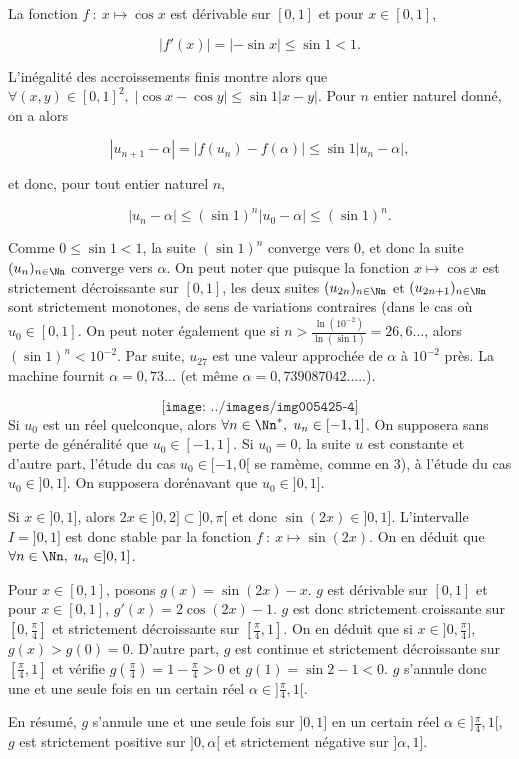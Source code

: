 {{La fonction $f~:~x\mapsto\cos x$ est dérivable sur $[0,1]$ et pour $x\in[0,1]$,

$$|f'(x)|=|-\sin x|\leq\sin1<1.$$

L'inégalité des accroissements finis montre alors que $\forall(x,y)\in[0,1]^2,\;|\cos x-\cos y|\leq\sin1|x-y|$. Pour $n$ entier naturel donné, on a alors

$$|u_{n+1}-\alpha|=|f(u_n)-f(\alpha)|\leq\sin1|u_n-\alpha|,$$

et donc, pour tout entier naturel $n$,

$$|u_n-\alpha|\leq(\sin1)^n|u_0-\alpha|\leq(\sin1)^n.$$

Comme $0\leq\sin1<1$, la suite $(\sin1)^n$ converge vers $0$, et donc la suite $(u_n)_{n\in\Nn}$ converge vers $\alpha$. On peut noter que puisque la fonction $x\mapsto\cos x$ est strictement décroissante sur $[0,1]$, les deux suites $(u_{2n})_{n\in\Nn}$ et $(u_{2n+1})_{n\in\Nn}$ sont strictement monotones, de sens de variations contraires (dans le cas où $u_0\in[0,1]$. On peut noter également que si $n>\frac{\ln(10^{-2})}{\ln(\sin1)}=26,6...$, alors $(\sin1)^n<10^{-2}$. Par suite, $u_{27}$ est une valeur approchée de $\alpha$ à $10^{-2}$ près. La machine fournit $\alpha=0,73...$ (et même $\alpha=0,739087042.....$).

$$\texttt{[image: ../images/img005425-4]}$$
Si $u_0$ est un réel quelconque, alors $\forall n\in\Nn^*,\;u_n\in[-1,1]$. On supposera sans perte de généralité que $u_0\in[-1,1]$. Si $u_0=0$, la suite $u$ est constante et d'autre part, l'étude du cas $u_0\in[-1,0[$ se ramème, comme en 3), à l'étude du cas $u_0\in]0,1]$. On supposera dorénavant que $u_0\in]0,1]$.

Si $x\in]0,1]$, alors $2x\in]0,2]\subset]0,\pi[$ et donc $\sin(2x)\in]0,1]$. L'intervalle $I=]0,1]$ est donc stable par la fonction $f~:~x\mapsto\sin(2x)$. On en déduit que $\forall n\in\Nn,\;u_n\in]0,1]$.

Pour $x\in[0,1]$, posons $g(x)=\sin(2x)-x$. $g$ est dérivable sur $[0,1]$ et pour $x\in[0,1]$, $g'(x)=2\cos(2x)-1$. $g$ est donc strictement croissante sur $[0,\frac{\pi}{4}]$ et strictement décroissante sur $[\frac{\pi}{4},1]$. On en déduit que si $x\in]0,\frac{\pi}{4}]$, $g(x)>g(0)=0$. D'autre part, $g$ est continue et strictement décroissante sur $[\frac{\pi}{4},1]$ et vérifie $g(\frac{\pi}{4})=1-\frac{\pi}{4}>0$ et $g(1)=\sin2-1<0$. $g$ s'annule donc une et une seule fois en un certain réel $\alpha\in]\frac{\pi}{4},1[$.

En résumé, $g$ s'annule une et une seule fois sur $]0,1]$ en un certain réel $\alpha\in]\frac{\pi}{4},1[$, $g$ est strictement positive sur $]0,\alpha[$ et strictement négative sur $]\alpha,1]$.

}}
